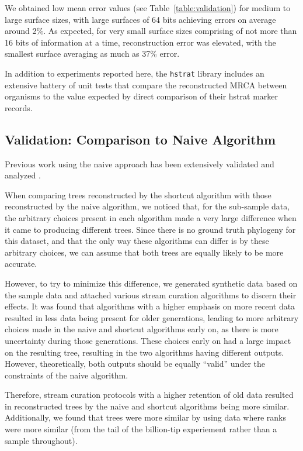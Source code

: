 

We obtained low mean error values (see Table~\ref{table:validation}) for medium to large surface sizes, with large surfaces of 64 bits achieving errors on average around 2\%. 
As expected, for very small surface sizes comprising of not more than 16 bits of information at a time, reconstruction error was elevated, with the smallest surface averaging as much as 37\% error.

In addition to experiments reported here, the \texttt{hstrat} library includes an extensive battery of unit tests that compare the reconstructed MRCA between organisms to the value expected by direct comparison of their hstrat marker records.

\subsection{Validation: Comparison to Naive Algorithm}

Previous work using the naive approach has been extensively validated and analyzed \citep{moreno2025testing}.

When comparing trees reconstructed by the shortcut algorithm with those reconstructed by the naive algorithm, we noticed that, for the sub-sample data, the arbitrary choices present in each algorithm made a very large difference when it came to producing different trees.
Since there is no ground truth phylogeny for this dataset, and that the only way these algorithms can differ is by these arbitrary choices, we can assume that both trees are equally likely to be more accurate.

However, to try to minimize this difference, we generated synthetic data based on the sample data and attached various stream curation algorithms to discern their effects.
It was found that algorithms with a higher emphasis on more recent data resulted in less data being present for older generations, leading to more arbitrary choices made in the naive and shortcut algorithms early on, as there is more uncertainty during those generations.
These choices early on had a large impact on the resulting tree, resulting in the two algorithms having different outputs. However, theoretically, both outputs should be equally ``valid'' under the constraints of the naive algorithm. 

Therefore, stream curation protocols with a higher retention of old data resulted in reconstructed trees by the naive and shortcut algorithms being more similar. Additionally, we found that trees were more similar by using data where ranks were more similar (from the tail of the billion-tip experiement rather than a sample throughout).

